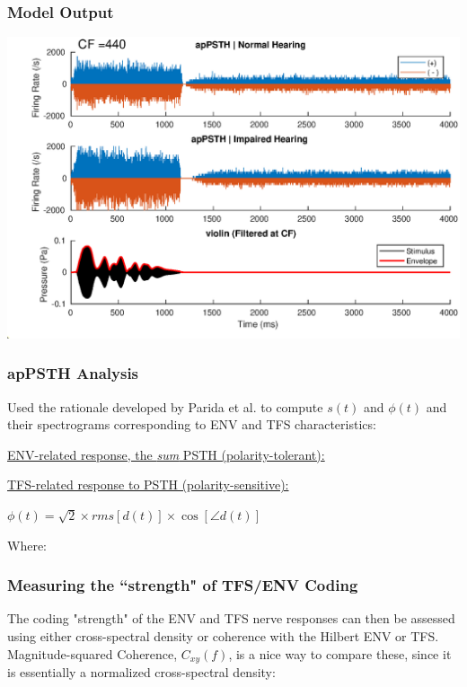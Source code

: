 \documentclass[aspectratio=1610]{beamer}
\begin{document}
\begin{frame}
\frametitle{Model Output}
\includegraphics[width = .88\textwidth]{apPSTH_violin}
\end{frame}

\begin{frame}

\frametitle{apPSTH Analysis}

Used the rationale developed by Parida et al. to compute $s(t)$ and $\phi (t)$ and their spectrograms corresponding to ENV and TFS characteristics:\vspace{1em}

\underline{ENV-related response, the \textit{sum} PSTH (polarity-tolerant):}\\
\begin{center}
\end{center}

\underline{TFS-related response to PSTH (polarity-sensitive):}\\
\begin{center}

$\phi (t) = \sqrt{2} \times rms[d(t)] \times \cos[\angle d(t)]$\\
\end{center}

Where:
 \begin{center}
\end{center}

\end{frame}

\begin{frame}

\frametitle{Measuring the ``strength" of TFS/ENV Coding}

The coding "strength" of the ENV and TFS nerve responses can then be assessed using either cross-spectral density or coherence with the Hilbert ENV or TFS. Magnitude-squared Coherence, $C_{xy}(f)$, is a nice way to compare these, since it is essentially a normalized cross-spectral density:\vspace{2em}

\begin{center}
\end{center}

\end{frame}
\end{document}
